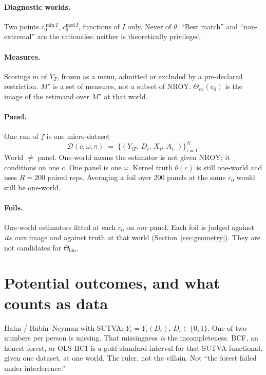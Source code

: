 \documentclass[11pt]{article}
\newcommand{\NROY}{\mathrm{NROY}}
\newcommand{\hm}{\mathrm{hm}}
\newcommand{\cv}{\mathrm{cv}}
\begin{document}
\paragraph{Diagnostic worlds.}
Two points $c_0^{\min I}$, $c_0^{\mathrm{med}\,I}$, functions of $I$
only. Never of $\theta$. ``Best match'' and ``non-extremal'' are the
rationales; neither is theoretically privileged.

\paragraph{Measures.}
Scorings $m$ of $Y_T$, frozen as a menu, admitted or excluded by a
pre-declared restriction. $M^\star$ is a set of measures, not a subset
of $\NROY$. $\Theta_{\cv}(c_0)$ is the image of the estimand over
$M^\star$ at that world.

\paragraph{Panel.}
One run of $f$ is one micro-dataset
\begin{equation}
  \mathcal{D}(c,\omega,\pi)
  \;=\;
  \bigl\{(Y_{iT},\,D_i,\,X_i,\,A_{i\cdot})\bigr\}_{i=1}^{N}.
\end{equation}
World $\neq$ panel. One-world means the estimator is not given
$\NROY$; it conditions on one $c$. One panel is one $\omega$. Kernel
truth $\theta(c)$ is still one-world and uses $R=200$ paired reps.
Averaging a foil over 200 panels at the same $c_0$ would still be
one-world.

\paragraph{Foils.}
One-world estimators fitted at each $c_0$ on \emph{one} panel. Each
foil is judged against \emph{its own} image and against truth at that
world (Section~\ref{sec:geometry}). They are not candidates for
$\Theta_{\hm}$.

\section{Potential outcomes, and what counts as data}
\label{sec:po}

Hahn / Rubin--Neyman with SUTVA: $Y_i=Y_i(D_i)$, $D_i\in\{0,1\}$. One
of two numbers per person is missing. That missingness \emph{is} the
incompleteness. BCF, an honest forest, or OLS-HC1 is a gold-standard
interval for that SUTVA functional, given one dataset, at one world.
The ruler, not the villain. Not ``the forest failed under
interference.''
\end{document}
